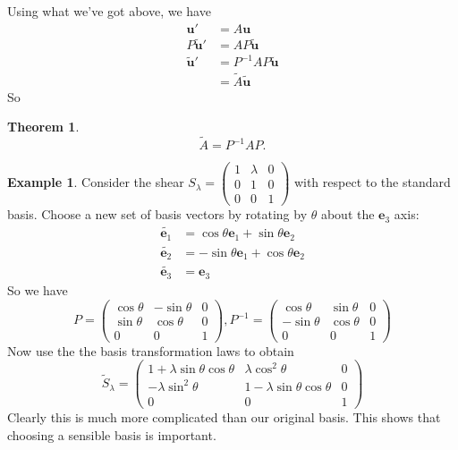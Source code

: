 \documentclass[a4paper]{article}
\theoremstyle{definition}
\newtheorem*{thm}{Theorem}
\newtheorem*{eg}{Example}
\newcommand{\mb}[1]{\mathbf{#1}}
\begin{document}
Using what we've got above, we have
\begin{align*}
  \mb{u}' &= A\mb{u}\\
  P\mb{\tilde{u}'} &= AP\tilde{\mb{u}}\\
  \mb{\tilde{u}'} &= P^{-1}AP\mathbf{\tilde{u}}\\
  &= \tilde{A}\tilde{\mb{u}}
\end{align*}
So
\begin{thm}
  \[
  \tilde{A} = P^{-1}AP.
  \]
\end{thm}

\begin{eg}
  Consider the shear $S_\lambda = 
  \begin{pmatrix}
    1 & \lambda & 0\\
    0 & 1 & 0\\
    0 & 0 & 1
  \end{pmatrix}$ with respect to the standard basis. Choose a new set of basis vectors by rotating by $\theta$ about the $\mb{e}_3$ axis:
  \begin{align*}
    \tilde{\mb{e}_1} &= \cos\theta \mb{e}_1 + \sin\theta \mb{e}_2\\
    \tilde{\mb{e}_2} &= -\sin\theta \mb{e}_1 + \cos\theta \mb{e}_2\\
    \tilde{\mb{e}_3} &= \mb{e}_3
  \end{align*}
  So we have
  \[
  P = 
  \begin{pmatrix}
    \cos\theta  & -\sin\theta & 0\\
    \sin\theta & \cos\theta & 0\\
    0 & 0 & 1
  \end{pmatrix}, P^{-1} = 
  \begin{pmatrix}
    \cos\theta  & \sin\theta & 0\\
    -\sin\theta & \cos\theta & 0\\
    0 & 0 & 1
  \end{pmatrix}
  \]
  Now use the the basis transformation laws to obtain
  \[
  \tilde{S}_\lambda = 
  \begin{pmatrix}
    1 + \lambda\sin\theta\cos\theta & \lambda \cos^2\theta & 0\\
    -\lambda \sin^2\theta & 1 - \lambda\sin\theta\cos\theta & 0\\
    0 & 0 & 1
  \end{pmatrix}
  \]
  Clearly this is much more complicated than our original basis. This shows that choosing a sensible basis is important. 
\end{eg}
\end{document}

